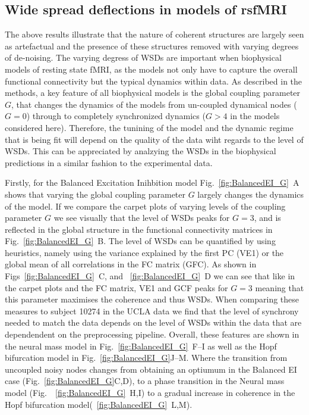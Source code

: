 \documentclass[oneside]{zHenriquesLab-StyleBioRxiv}
\begin{document}
\subsection*{Wide spread deflections in models of rsfMRI}

The above results illustrate that the nature of coherent structures are largely seen as artefactual and the presence of these structures removed with varying degrees of de-noising. The varying degress of WSDs are important when biophysical models of resting state fMRI, as the models not only have to capture the overall functional connectivity but the typical dynamics within data. As described in the methods, a key feature of all biophysical models is the global coupling parameter $G$, that changes the dynamics of the models from un-coupled dynamical nodes ($G=0$) through to completely synchronized dynamics ($G>4$ in the models considered here). Therefore, the tunining of the model and the dynamic regime that is being fit will depend on the quality of the data wiht regards to the level of WSDs. This can be appreciated by analzying the WSDs in the biophysical predictions in a similar fashion to the experimental data.

Firstly, for the Balanced Excitation Inihbition model Fig.~\ref{fig:BalancedEI_G}~A shows that varying the global coupling parameter $G$ largely changes the dynamics of the model. If we compare the carpet plots of varying levels of the coupling parameter $G$ we see visually that the level of WSDs peaks for $G=3$, and is reflected in the global structure in the functional connectivity matrices in Fig.~\ref{fig:BalancedEI_G}~B. The level of WSDs can be quantified by using heuristics, namely using the variance explained by the first PC (VE1) or the global mean of all correlations in the FC matrix (GFC). As shown in Figs~\ref{fig:BalancedEI_G}~C, and ~\ref{fig:BalancedEI_G}~D we can see that like in the carpet plots and the FC matrix, VE1 and GCF peaks for $G=3$ meaning that this parameter maximises the coherence and thus WSDs. When comparing these measures to subject 10274 in the UCLA data we find that the level of synchrony needed to match the data depends on the level of WSDs within the data that are dependendent on the preprocessing pipeline. Overall, these features are shown in the neural mass model in Fig.~\ref{fig:BalancedEI_G}~F--I as well as the Hopf bifurcation model in Fig.~\ref{fig:BalancedEI_G}J--M. Where the transition from uncoupled noisy nodes changes from obtaining an optiumum in the Balanced EI case (Fig.~\ref{fig:BalancedEI_G}C,D), to a phase transition in the Neural mass model (Fig.~~\ref{fig:BalancedEI_G}~H,I) to a gradual increase in coherence in the Hopf bifurcation model(~\ref{fig:BalancedEI_G}~L,M). 
\end{document}
